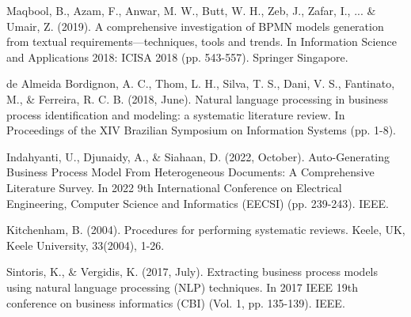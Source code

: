\documentclass[runningheads]{llncs}
\begin{document}
				
	\newpage
	\begin{thebibliography}{99}
	
	Maqbool, B., Azam, F., Anwar, M. W., Butt, W. H., Zeb, J., Zafar, I., ... \& Umair, Z. (2019). A comprehensive investigation of BPMN models generation from textual requirements—techniques, tools and trends. In Information Science and Applications 2018: ICISA 2018 (pp. 543-557). Springer Singapore.
	
	de Almeida Bordignon, A. C., Thom, L. H., Silva, T. S., Dani, V. S., Fantinato, M., \& Ferreira, R. C. B. (2018, June). Natural language processing in business process identification and modeling: a systematic literature review. In Proceedings of the XIV Brazilian Symposium on Information Systems (pp. 1-8).
	
	Indahyanti, U., Djunaidy, A., \& Siahaan, D. (2022, October). Auto-Generating Business Process Model From Heterogeneous Documents: A Comprehensive Literature Survey. In 2022 9th International Conference on Electrical Engineering, Computer Science and Informatics (EECSI) (pp. 239-243). IEEE.
	
	Kitchenham, B. (2004). Procedures for performing systematic reviews. Keele, UK, Keele University, 33(2004), 1-26.
	
	Sintoris, K., \& Vergidis, K. (2017, July). Extracting business process models using natural language processing (NLP) techniques. In 2017 IEEE 19th conference on business informatics (CBI) (Vol. 1, pp. 135-139). IEEE.
	
	\end{thebibliography}

	
\end{document}

